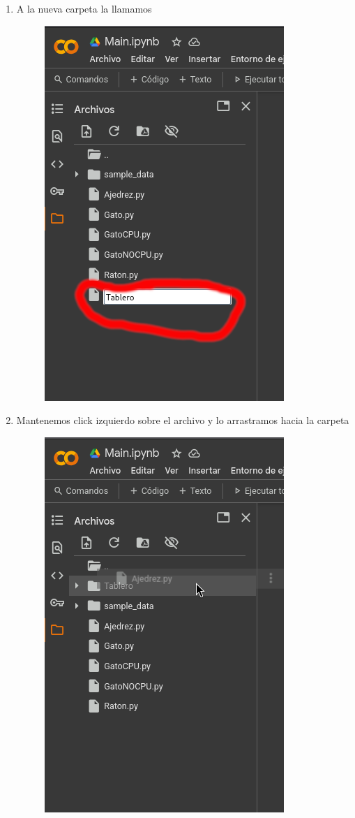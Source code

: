 \documentclass[12pt, Tahoma]{article}
\begin{document}
\begin{enumerate}
\begin{figure}[H]
			\end{figure}
		\item A la nueva carpeta la llamamos 
			\begin{figure}[H]
				\centering
				\includegraphics[scale=2]{correr16.png}
			\end{figure}
		\item Mantenemos click izquierdo sobre el archivo  y lo arrastramos hacia la carpeta 
			\begin{figure}[H]
				\centering
				\includegraphics[scale=0.6]{correr17.png}

\end{figure}
\end{enumerate}
\end{document}

